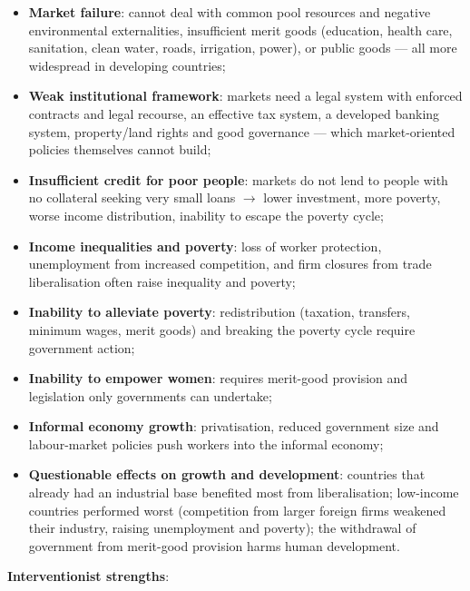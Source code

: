 \begin{itemize}
  \item \textbf{Market failure}: cannot deal with common pool resources and negative environmental externalities, insufficient merit goods (education, health care, sanitation, clean water, roads, irrigation, power), or public goods --- all more widespread in developing countries;
  \item \textbf{Weak institutional framework}: markets need a legal system with enforced contracts and legal recourse, an effective tax system, a developed banking system, property/land rights and good governance --- which market-oriented policies themselves cannot build;
  \item \textbf{Insufficient credit for poor people}: markets do not lend to people with no collateral seeking very small loans $\to$ lower investment, more poverty, worse income distribution, inability to escape the poverty cycle;
  \item \textbf{Income inequalities and poverty}: loss of worker protection, unemployment from increased competition, and firm closures from trade liberalisation often raise inequality and poverty;
  \item \textbf{Inability to alleviate poverty}: redistribution (taxation, transfers, minimum wages, merit goods) and breaking the poverty cycle require government action;
  \item \textbf{Inability to empower women}: requires merit-good provision and legislation only governments can undertake;
  \item \textbf{Informal economy growth}: privatisation, reduced government size and labour-market policies push workers into the informal economy;
  \item \textbf{Questionable effects on growth and development}: countries that already had an industrial base benefited most from liberalisation; low-income countries performed worst (competition from larger foreign firms weakened their industry, raising unemployment and poverty); the withdrawal of government from merit-good provision harms human development.
\end{itemize}
\textbf{Interventionist strengths}:
